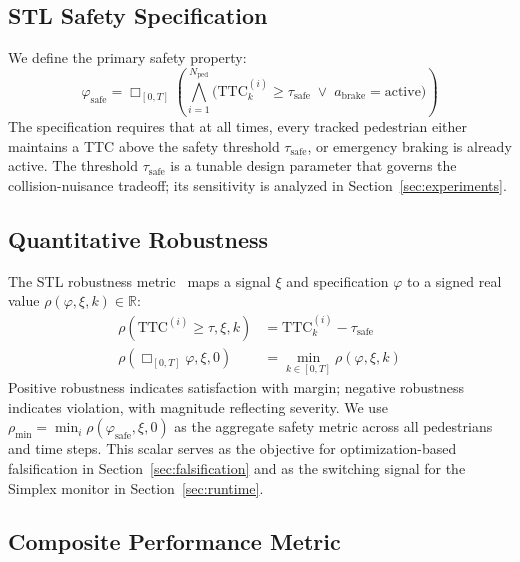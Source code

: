 \documentclass[conference]{IEEEtran}
\begin{document}
\subsection{STL Safety Specification}

We define the primary safety property:
\begin{equation}
    \varphi_{\text{safe}} = \Box_{[0,T]}\!\left(\bigwedge_{i=1}^{N_{\text{ped}}} \bigl(\mathrm{TTC}_k^{(i)} \geq \tau_{\text{safe}} \;\lor\; a_{\text{brake}} = \text{active}\bigr)\right)
    \label{eq:stl_spec}
\end{equation}
The specification requires that at all times, every tracked pedestrian either maintains a TTC above the safety threshold $\tau_{\text{safe}}$, or emergency braking is already active. The threshold $\tau_{\text{safe}}$ is a tunable design parameter that governs the collision-nuisance tradeoff; its sensitivity is analyzed in Section~\ref{sec:experiments}.

\subsection{Quantitative Robustness}

The STL robustness metric~\cite{donze2010robust} maps a signal $\xi$ and specification $\varphi$ to a signed real value $\rho(\varphi, \xi, k) \in \mathbb{R}$:
\begin{align}
    \rho(\mathrm{TTC}^{(i)} \geq \tau, \xi, k) &= \mathrm{TTC}_k^{(i)} - \tau_{\text{safe}} \label{eq:robustness_atom} \\
    \rho(\Box_{[0,T]} \varphi, \xi, 0) &= \min_{k \in [0,T]} \rho(\varphi, \xi, k) \label{eq:robustness_always}
\end{align}
Positive robustness indicates satisfaction with margin; negative robustness indicates violation, with magnitude reflecting severity. We use $\rho_{\min} = \min_i \rho(\varphi_{\text{safe}}, \xi, 0)$ as the aggregate safety metric across all pedestrians and time steps. This scalar serves as the objective for optimization-based falsification in Section~\ref{sec:falsification} and as the switching signal for the Simplex monitor in Section~\ref{sec:runtime}.

\subsection{Composite Performance Metric}
\end{document}
